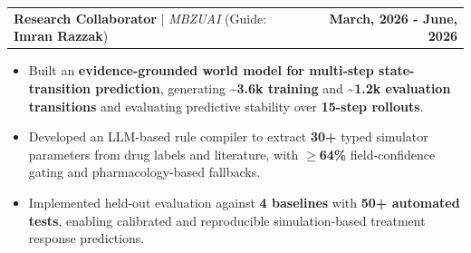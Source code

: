 \documentclass[letterpaper,11pt]{article}
\makeatletter
\newcommand{\resumeItem}[1]{
  \item\small{
    {#1 \vspace{-2pt}}
  }
}
\newcommand{\resumeProjectHeading}[2]{
    \item
    \begin{tabular*}{0.97\textwidth}{l@{\extracolsep{\fill}}r}
      \small#1 & #2 \\
    \end{tabular*}\vspace{-7pt}
}
\newcommand{\resumeItemListStart}{\begin{itemize}}
\newcommand{\resumeItemListEnd}{\end{itemize}\vspace{-5pt}}
\makeatother
\begin{document}
\resumeProjectHeading
{\textbf{\textcolor[HTML]{4775BA}{Research Collaborator}} $|$ \footnotesize\emph{MBZUAI} (Guide: \textbf{Imran Razzak})\vspace{8pt}}{\textbf{\small{March, 2026 - June, 2026}}}
\resumeItemListStart
\vspace{-0.5em}
\resumeItem{Built an \textbf{evidence-grounded world model for multi-step state-transition prediction}, generating \textbf{\textasciitilde3.6k training} and \textbf{\textasciitilde1.2k evaluation transitions} and evaluating predictive stability over \textbf{15-step rollouts}.}
\vspace{-0.5em}
\resumeItem{Developed an LLM-based rule compiler to extract \textbf{30+} typed simulator parameters from drug labels and literature, with \textbf{$\geq$64\%} field-confidence gating and pharmacology-based fallbacks.}
\vspace{-0.5em}
\resumeItem{Implemented held-out evaluation against \textbf{4 baselines} with \textbf{50+ automated tests}, enabling calibrated and reproducible simulation-based treatment response predictions.}
\resumeItemListEnd
\end{document}
